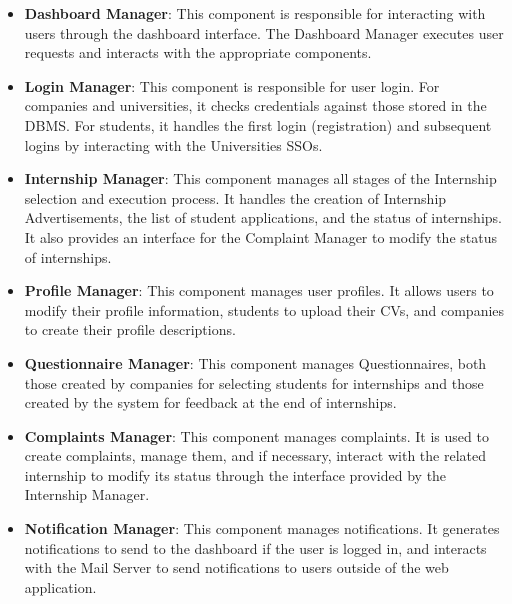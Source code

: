 \begin{itemize}
    \item \textbf{Dashboard Manager}: This component is responsible for interacting with users through the dashboard interface.
                                    The Dashboard Manager executes user requests and interacts with the appropriate components.

    \item \textbf{Login Manager}: This component is responsible for user login. For companies and universities,
                                it checks credentials against those stored in the DBMS. For students, it handles the first login (registration) 
                                and subsequent logins by interacting with the Universities SSOs.

    \item \textbf{Internship Manager}: This component manages all stages of the Internship selection and execution process.
                                    It handles the creation of Internship Advertisements, the list of student applications,
                                    and the status of internships. It also provides an interface for the Complaint Manager to modify the status of internships.
    
    \item \textbf{Profile Manager}: This component manages user profiles. It allows users to modify their profile information,
                                    students to upload their CVs, and companies to create their profile descriptions.
    
    \item \textbf{Questionnaire Manager}: This component manages Questionnaires, both those created by companies for selecting students for internships 
    and those created by the system for feedback at the end of internships. 
    
    \item \textbf{Complaints Manager}: This component manages complaints. It is used to create complaints, manage them, and if necessary,
    interact with the related internship to modify its status through the interface provided by the Internship Manager.
    
    \item \textbf{Notification Manager}: This component manages notifications. It generates notifications to send to the 
    dashboard if the user is logged in, and interacts with the Mail Server to send notifications to users outside of the web application.
    

\end{itemize}
